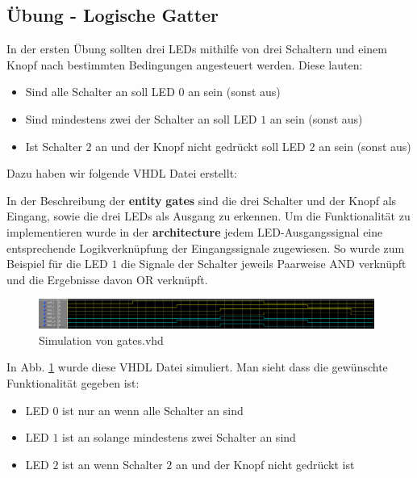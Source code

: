 \subsection{Übung - Logische Gatter}

In der ersten Übung sollten drei LEDs mithilfe von drei Schaltern und einem Knopf nach bestimmten Bedingungen angesteuert werden. Diese lauten:
\begin{itemize}
    \item Sind alle Schalter an soll LED $0$ an sein (sonst aus)
    \item Sind mindestens zwei der Schalter an soll LED $1$ an sein (sonst aus)
    \item Ist Schalter $2$ an und der Knopf nicht gedrückt soll LED $2$ an sein (sonst aus)
\end{itemize}

Dazu haben wir folgende VHDL Datei erstellt:



In der Beschreibung der \textbf{entity} \textbf{gates} sind die drei Schalter und der Knopf als Eingang, sowie die drei LEDs als Ausgang zu erkennen.
Um die Funktionalität zu implementieren wurde in der \textbf{architecture} jedem LED-Ausgangssignal eine entsprechende Logikverknüpfung der Eingangssignale zugewiesen.
So wurde zum Beispiel für die LED $1$ die Signale der Schalter jeweils Paarweise AND verknüpft und die Ergebnisse davon OR verknüpft.

\begin{figure}[ht]
	\centering
    \includegraphics[width=0.98\textwidth]{../Daten/gates.png}
	\caption{Simulation von gates.vhd}
	\label{img_gates}
\end{figure}

In Abb. \ref{img_gates} wurde diese VHDL Datei simuliert.
Man sieht dass die gewünschte Funktionalität gegeben ist:
\begin{itemize}
    \item LED $0$ ist nur an wenn alle Schalter an sind
    \item LED $1$ ist an solange mindestens zwei Schalter an sind
    \item LED $2$ ist an wenn Schalter $2$ an und der Knopf nicht gedrückt ist
\end{itemize}

